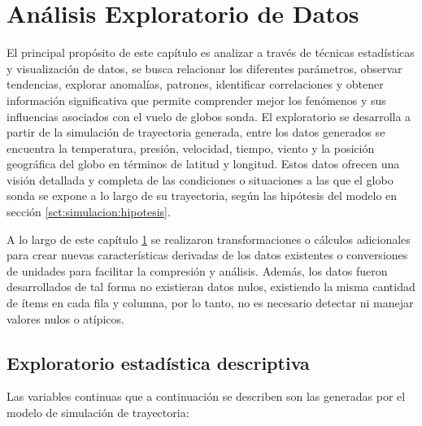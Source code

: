 \chapter{Análisis Exploratorio de Datos} \label{chp:03_eda}

\vspace{0.2cm}

 El principal propósito de este capítulo es analizar a través de técnicas estadísticas y visualización de datos,  se busca  relacionar los diferentes parámetros, observar tendencias, explorar anomalías, patrones, identificar correlaciones y obtener información significativa que permite comprender mejor los fenómenos y sus influencias asociados con el vuelo de globos sonda. El exploratorio se desarrolla a partir de la simulación de trayectoria generada, entre los datos generados se encuentra la temperatura,  presión, velocidad, tiempo, viento y la posición geográfica del globo en términos de latitud y longitud.  Estos datos ofrecen una visión detallada y completa de las condiciones  o situaciones a las que el globo sonda se expone a lo largo de su trayectoria, según las hipótesis del modelo en sección \ref{sct:simulacion:hipotesis}.

\vspace{0.4cm}

A lo largo de este capítulo \ref{chp:03_eda}  se realizaron transformaciones o cálculos adicionales para crear nuevas características derivadas  de los datos existentes o conversiones de unidades para facilitar la compresión y análisis. Además, los datos fueron desarrollados de tal forma no existieran datos nulos, existiendo la misma cantidad de ítems en cada fila y columna, por lo tanto, no es necesario detectar ni manejar valores nulos o atípicos.

\newpage

\section{Exploratorio estadística descriptiva}

Las variables continuas que a continuación se describen son las generadas por el modelo de simulación de trayectoria:

\vspace{0.4 cm}


